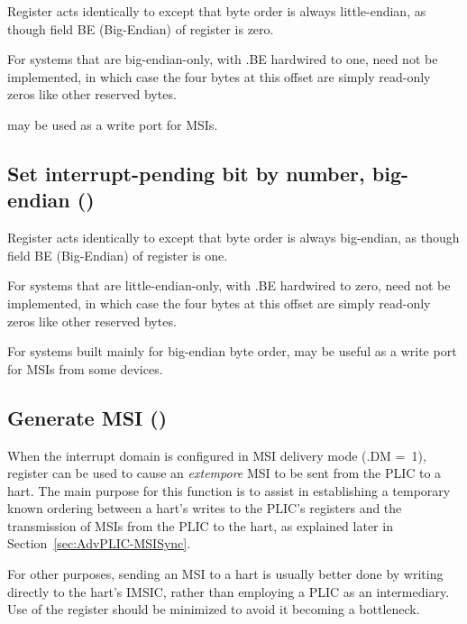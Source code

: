 Register  acts identically to  except that
byte order is always little-endian, as though field BE (Big-Endian) of
register  is zero.

For systems that are big-endian-only, with .BE hardwired
to one,  need not be implemented, in which case
the four bytes at this offset are simply read-only zeros like other
reserved bytes.

 may be used as a write port for MSIs.

\subsection{%
Set interrupt-pending bit by number, big-endian ()%
}

Register  acts identically to  except that
byte order is always big-endian, as though field BE (Big-Endian) of
register  is one.

For systems that are little-endian-only, with .BE
hardwired to zero,  need not be implemented, in which
case the four bytes at this offset are simply read-only zeros like
other reserved bytes.

For systems built mainly for big-endian byte order, 
may be useful as a write port for MSIs from some devices.

\subsection{Generate MSI ()}
\label{sec:AdvPLIC-reg-genmsi}

When the interrupt domain is configured in MSI delivery mode
(.DM =~1), register  can be used to cause an
\emph{extempore} MSI to be sent from the PLIC to a hart.
The main purpose for this function is to assist in establishing
a temporary known ordering between a hart's writes to the PLIC's
registers and the transmission of MSIs from the PLIC to the hart, as
explained later in Section~\ref{sec:AdvPLIC-MSISync}.

\begin{commentary}
For other purposes, sending an MSI to a hart is usually better done by
writing directly to the hart's IMSIC, rather than employing a PLIC as
an intermediary.
Use of the  register should be minimized to avoid it becoming
a bottleneck.
\end{commentary}

